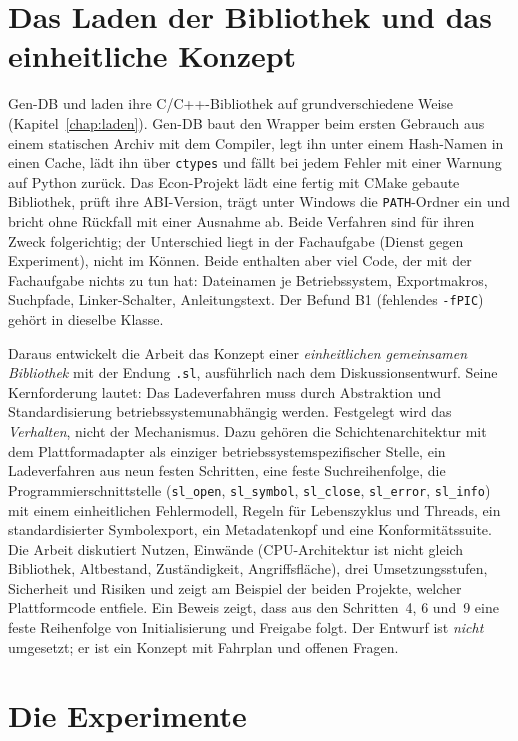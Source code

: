 \section{Das Laden der Bibliothek und das einheitliche Konzept}

Gen-DB und  laden ihre C/C++-Bibliothek auf grundverschiedene Weise (Kapitel~\ref{chap:laden}). Gen-DB baut den Wrapper beim ersten Gebrauch aus einem statischen Archiv mit dem Compiler, legt ihn unter einem Hash-Namen in einen Cache, lädt ihn über \texttt{ctypes} und fällt bei jedem Fehler mit einer Warnung auf Python zurück. Das Econ-Projekt lädt eine fertig mit CMake gebaute Bibliothek, prüft ihre ABI-Version, trägt unter Windows die \texttt{PATH}-Ordner ein und bricht ohne Rückfall mit einer Ausnahme ab. Beide Verfahren sind für ihren Zweck folgerichtig; der Unterschied liegt in der Fachaufgabe (Dienst gegen Experiment), nicht im Können. Beide enthalten aber viel Code, der mit der Fachaufgabe nichts zu tun hat: Dateinamen je Betriebssystem, Exportmakros, Suchpfade, Linker-Schalter, Anleitungstext. Der Befund B1 (fehlendes \texttt{-fPIC}) gehört in dieselbe Klasse.

Daraus entwickelt die Arbeit das Konzept einer \emph{einheitlichen gemeinsamen Bibliothek} mit der Endung \texttt{.sl}, ausführlich nach dem Diskussionsentwurf. Seine Kernforderung lautet: Das Ladeverfahren muss durch Abstraktion und Standardisierung betriebssystemunabhängig werden. Festgelegt wird das \emph{Verhalten}, nicht der Mechanismus. Dazu gehören die Schichtenarchitektur mit dem Plattformadapter als einziger betriebssystemspezifischer Stelle, ein Ladeverfahren aus neun festen Schritten, eine feste Suchreihenfolge, die Programmierschnittstelle (\texttt{sl\_open}, \texttt{sl\_symbol}, \texttt{sl\_close}, \texttt{sl\_error}, \texttt{sl\_info}) mit einem einheitlichen Fehlermodell, Regeln für Lebenszyklus und Threads, ein standardisierter Symbolexport, ein Metadatenkopf und eine Konformitätssuite. Die Arbeit diskutiert Nutzen, Einwände (CPU-Architektur ist nicht gleich Bibliothek, Altbestand, Zuständigkeit, Angriffsfläche), drei Umsetzungsstufen, Sicherheit und Risiken und zeigt am Beispiel der beiden Projekte, welcher Plattformcode entfiele. Ein Beweis zeigt, dass aus den Schritten~4, 6 und~9 eine feste Reihenfolge von Initialisierung und Freigabe folgt. Der Entwurf ist \emph{nicht} umgesetzt; er ist ein Konzept mit Fahrplan und offenen Fragen.

\section{Die Experimente}

